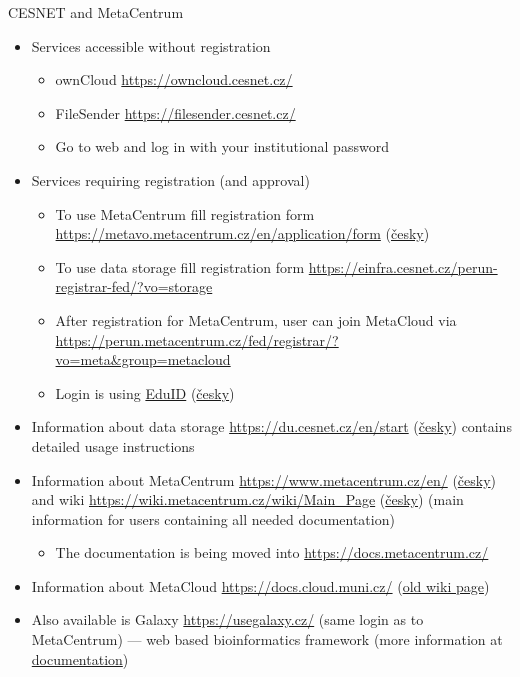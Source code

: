 \documentclass[compress, xelatex, 11pt, xcolor=svgnames, aspectratio=169,
	hyperref={
		bookmarks=true,
		unicode=true,
		colorlinks=true,
		pdftitle={Linux, command line and MetaCentrum},
		plainpages=false,
		pdfauthor={Vojtech Zeisek},
		pdfsubject={Course about use of Linux command line, writing shell scripts and using MetaCentrum of CESNET},
		pdfcreator={XeLaTeX},
		pdfkeywords={Linux, GNU, BASH, shell, command line, MetaCentrum},
		linkcolor=DarkRed, %
		anchorcolor=DarkBlue, %
		citecolor=Indigo, %
		filecolor=NavyBlue, %
		menucolor=DarkMagenta, %
		urlcolor=DarkBlue, %
		},
	url={hyphens, lowtilde} %
	]{beamer}
\begin{document}
\begin{frame}[allowframebreaks]{CESNET and MetaCentrum}
\begin{itemize}
\begin{itemize}
		\end{itemize}
		\item Services accessible without registration
		\begin{itemize}
			\item ownCloud \url{https://owncloud.cesnet.cz/}
			\item FileSender \url{https://filesender.cesnet.cz/}
			\item Go to web and log in with your institutional password
		\end{itemize}
		\item Services requiring registration (and approval)
		\begin{itemize}
			\item To use MetaCentrum fill registration form \url{https://metavo.metacentrum.cz/en/application/form} (\href{https://metavo.metacentrum.cz/cs/application/}{česky})
			\item To use data storage fill registration form \url{https://einfra.cesnet.cz/perun-registrar-fed/?vo=storage}
			\item After registration for MetaCentrum, user can join MetaCloud via \url{https://perun.metacentrum.cz/fed/registrar/?vo=meta&group=metacloud}
			\item Login is using \href{https://www.eduid.cz/en/index}{EduID} (\href{https://www.eduid.cz/cs/index}{česky})
		\end{itemize}
		\item Information about data storage \url{https://du.cesnet.cz/en/start} (\href{https://du.cesnet.cz/cs/start}{česky}) contains detailed usage instructions
		\item Information about MetaCentrum \url{https://www.metacentrum.cz/en/} (\href{https://www.metacentrum.cz/cs/}{česky}) and wiki \url{https://wiki.metacentrum.cz/wiki/Main_Page} (\href{https://wiki.metacentrum.cz/wiki/Hlavn\%C3\%AD_strana}{česky}) (main information for users containing all needed documentation)
		\begin{itemize}
			\item The documentation is being moved into \url{https://docs.metacentrum.cz/}
		\end{itemize}
		\item Information about MetaCloud \url{https://docs.cloud.muni.cz/} (\href{https://wiki.metacentrum.cz/wiki/Kategorie:Clouds}{old wiki page})
		\item Also available is Galaxy \url{https://usegalaxy.cz/} (same login as to MetaCentrum) --- web based bioinformatics framework (more information at \href{https://docs.metacentrum.cz/related/galaxy/}{documentation})

\end{itemize}
\end{frame}
\end{document}
